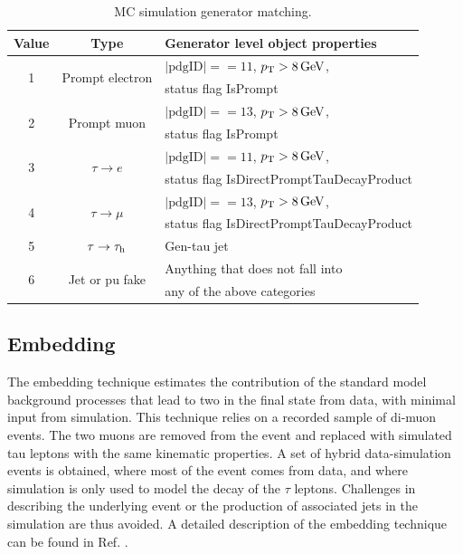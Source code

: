 \begin{table}[]
    \centering
    \caption{MC simulation generator matching.}
    \begin{tabular}{|c|c|l|}
        \hline
        Value & Type & Generator level object properties \\
        \hline
        \multirow{2}{*}{1} & \multirow{2}{*}{Prompt electron} & $|\mathrm{pdgID}|==11$, $p_{\mathrm{T}} > 8 \,\mathrm{GeV}$,\\
         & &  status flag IsPrompt \\
        \hline
        \multirow{2}{*}{2} & \multirow{2}{*}{Prompt muon} & $|\mathrm{pdgID}|==13$, $p_{\mathrm{T}} > 8 \,\mathrm{GeV}$, \\
         & & status flag IsPrompt \\
        \hline
        \multirow{2}{*}{3} & \multirow{2}{*}{$\tau \rightarrow e$} & $|\mathrm{pdgID}|==11$, $p_{\mathrm{T}} > 8 \,\mathrm{GeV}$,\\
         & &  status flag IsDirectPromptTauDecayProduct \\
        \hline
        \multirow{2}{*}{4} & \multirow{2}{*}{$\tau \rightarrow \mu$} & $|\mathrm{pdgID}|==13$, $p_{\mathrm{T}} > 8 \,\mathrm{GeV}$, \\
         & & status flag IsDirectPromptTauDecayProduct \\
        \hline
        \multirow{2}{*}{5} & \multirow{2}{*}{$\tau \rightarrow \tau_{\rm h}$} & \multirow{2}{*}{Gen-tau jet} \\
         & & \\
        \hline
        \multirow{2}{*}{6} & \multirow{2}{*}{Jet or pu fake}  & Anything that does not fall into \\
         & &  any of the above categories \\
        \hline
    \end{tabular}
    \label{tab:mc_matching}
\end{table}

\subsection{Embedding}
\label{sec:embedding}

The embedding technique estimates the contribution of the standard model background processes that lead to two \tauh in the final state from data, with minimal input from simulation. This technique relies on a recorded sample of di-muon events. The two muons are removed from the event and replaced with simulated tau leptons with the same kinematic properties. A set of hybrid data-simulation events is obtained, where most of the event comes from data, and where simulation is only used to model the decay of the $\tau$ leptons. Challenges in describing the underlying event or the production of associated jets in the simulation are thus avoided. A detailed description of the embedding technique can be found in Ref. \cite{CMS:2018apv}.

